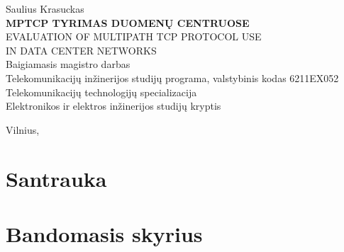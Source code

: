 \documentclass[12pt]{article}
\begin{document}
\begin{titlepage}
    {\large Saulius Krasuckas}
                                                          \\[24.5pt]
    {\large{\bfseries{MPTCP TYRIMAS DUOMENŲ CENTRUOSE}}}
                                                          \\[-5.0pt]
    {\large{EVALUATION OF MULTIPATH TCP PROTOCOL USE      \\
                   IN DATA CENTER NETWORKS}}
                                                          \\[36.5pt]

    {\large Baigiamasis magistro darbas}
                                                          \\[1.9pt]
    Telekomunikacijų inžinerijos studijų programa,
    valstybinis kodas 6211EX052                           \\
    Telekomunikacijų technologijų specializacija          \\
    Elektronikos ir elektros inžinerijos studijų kryptis  \\

    \vspace{\fill}

    Vilnius, \the\year

\end{titlepage}

\restoregeometry                       %


    \tableofcontents

\newpage


\section*{Santrauka}



    \blindtext                         %
    \par                               %
    \blindtext                         %

\newpage


\section{Bandomasis skyrius}

    \blindtext[10]                     %
\end{document}
